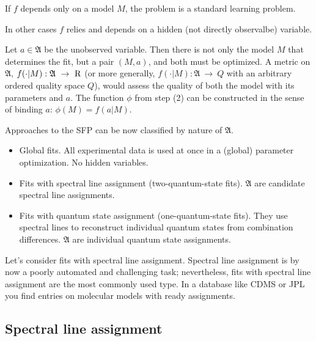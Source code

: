 \documentclass[11pt]{article}
\begin{document}
If $f$ depends only on a model $M$, the problem is a standard learning problem.

In other cases $f$ relies and depends on a hidden (not directly observalbe) variable.


Let $a \in \mathfrak{A}$ be the unobserved variable. Then there is not only the model $M$ that determines the fit, but a pair $(M, a)$, and both must be optimized. A metric on $\mathfrak{A}$, $f(\cdot | M): \mathfrak{A}~\rightarrow~{\mathrm{R}}$ (or more generally, $f(\cdot | M): \mathfrak{A}~\rightarrow~Q$ with an arbitrary ordered quality space $Q$), would assess the quality of both the model with its parameters and $a$. %
The function $\phi$ from step (2) can be constructed in the sense of binding $a$: $\phi(M) = f(a | M)$.

Approaches to the SFP can be now classified by nature of $\mathfrak{A}$.
\begin{itemize}
	\item Global fits. All experimental data is used at once in a (global) parameter optimization. No hidden variables.
	\item Fits with spectral line assignment (two-quantum-state fits). $\mathfrak{A}$ are candidate spectral line assignments.
	\item Fits with quantum state assignment (one-quantum-state fits). They use spectral lines to reconstruct individual quantum states from combination differences. $\mathfrak{A}$ are individual quantum state assignments.
\end{itemize}

Let's consider fits with spectral line assignment. Spectral line assignment is by now a poorly automated and challenging task; nevertheless, fits with spectral line assignment are the most commonly used type. In a database like CDMS or JPL you find entries on molecular models with ready assignments.

\subsection{Spectral line assignment}
\end{document}
